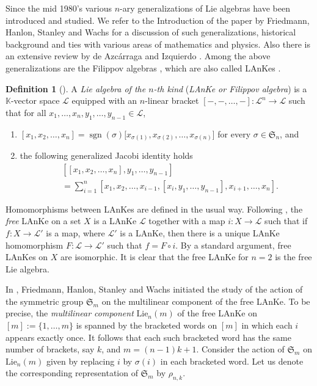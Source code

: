 \documentclass[11pt]{amsart}
\theoremstyle{definition}
\newtheorem{defn}[thm]{Definition}
\numberwithin{equation}{section}
\DeclareMathOperator{\sign}{sgn}
\begin{document}
Since the mid 1980's various $n$-ary generalizations of Lie algebras have been introduced and studied. We refer to the Introduction of the paper by Friedmann, Hanlon, Stanley and Wachs \cite{FHSW} for a discussion of such generalizations, historical background and ties with various areas of mathematics and physics. Also there is an extensive review by de Azcárraga and  Izquierdo \cite{AI}. Among the above generalizations are the Filippov algebras \cite{Fi}, which are also called LAnKes \cite{FHSW}.
\begin{defn}[{\cite[Definition 1.2]{FHSW}}]\label{lanke} A \textit{Lie algebra of the $n$-th kind} (\textit{LAnKe or Filippov algebra}) is a $\mathbb{K}$-vector space $\mathcal{L}$ equipped with an $n$-linear bracket $ [-,-, \dots, -] :  \mathcal{L}^n \to \mathcal{L}$ such that for all $x_1,\dots, x_n, y_1, \dots, y_{n-1} \in \mathcal{L}$,
	\begin{enumerate}
		\item $[x_1, x_2, \dots, x_n]=\sign(\sigma)[x_{\sigma(1)}, x_{\sigma(2)}, \dots, x_{\sigma(n)}$] for every $\sigma \in \mathfrak{S}_n$, and
		\item the following generalized Jacobi identity holds\begin{align}\label{GJI}
			&[[x_1,x_2,\dots,x_n],y_1,\dots, y_{n-1}]\\\nonumber&
			=\sum_{i=1}^{n}[x_1,x_2,\dots,x_{i-1},[x_i,y_1,\dots, y_{n-1}],x_{i+1},\dots, x_n].
		\end{align}
	\end{enumerate}
\end{defn}

Homomorphisms between LAnKes are defined in the usual way. Following \cite[Definition 2.1]{FHSW}, the
\textit{free} LAnKe on a set $X$ is a LAnKe $\mathcal{L}$ together with a map $i:X \to \mathcal{L}$ such that if $f:X \to \mathcal{L'}$ is a map, where $\mathcal{L'}$ is a LAnKe, then there is a unique LAnKe homomorphism $F: \mathcal{L} \to \mathcal{L'}$ such that $f=F \circ i$. By a standard argument, free LAnKes on $X$ are isomorphic. It is clear that the free LAnKe for $n=2$ is the free Lie algebra.

In \cite{FHSW}, Friedmann, Hanlon, Stanley and Wachs initiated the study of the action of the symmetric group $\mathfrak{S}_m$ on the multilinear component of the free LAnKe. To be precise, the \textit{multilinear component} $\text{Lie}_n(m)$ of the free LAnKe on $[m]:=\{1, \dots, m\}$ is spanned by the bracketed words on $[m]$ in which each $i$ appears exactly once. It follows that each such bracketed word has the same number of brackets, say $k$, and $m=(n-1)k+1$. Consider the action of $\mathfrak{S}_{m}$ on $\text{Lie}_n(m)$ given by replacing $i$ by $\sigma(i)$ in each bracketed word. Let us denote the corresponding representation of $\mathfrak{S}_m$ by $\rho_{n,k}$. 
\end{document}
